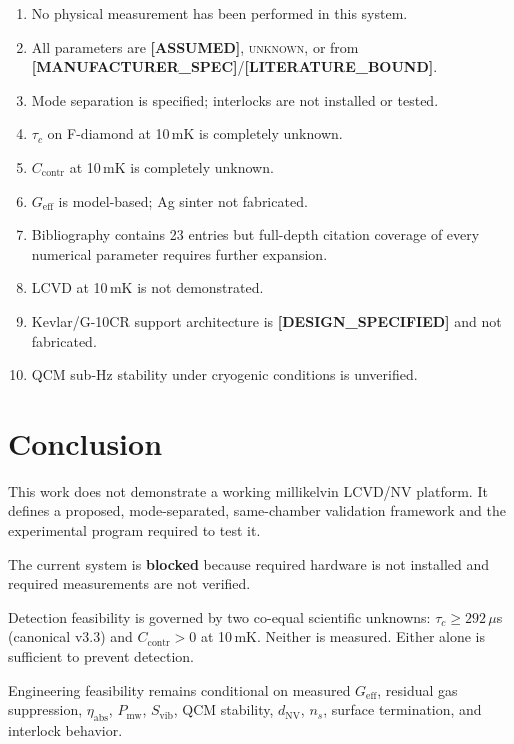 \documentclass[12pt,a4paper]{article}
\newcommand{\unknown}{\textsc{unknown}}
\newcommand{\assumed}{\textbf{[ASSUMED]}}
\newcommand{\designspec}{\textbf{[DESIGN\_SPECIFIED]}}
\newcommand{\mfrspec}{\textbf{[MANUFACTURER\_SPEC]}}
\newcommand{\litbound}{\textbf{[LITERATURE\_BOUND]}}
\begin{document}
\begin{enumerate}[noitemsep]
  \item No physical measurement has been performed in this system.
  \item All parameters are \assumed{}, \unknown{}, or from \mfrspec{}/\litbound{}.
  \item Mode separation is specified; interlocks are not installed or tested.
  \item $\tau_c$ on F-diamond at 10\,mK is completely unknown.
  \item $C_\mathrm{contr}$ at 10\,mK is completely unknown.
  \item $G_\mathrm{eff}$ is model-based; Ag sinter not fabricated.
  \item Bibliography contains 23 entries but full-depth citation coverage
        of every numerical parameter requires further expansion.
  \item LCVD at 10\,mK is not demonstrated.
  \item Kevlar/G-10CR support architecture is \designspec{} and not fabricated.
  \item QCM sub-Hz stability under cryogenic conditions is unverified.
\end{enumerate}

\section{Conclusion}
\label{sec:conclusion}

This work does not demonstrate a working millikelvin LCVD/NV platform.
It defines a proposed, mode-separated, same-chamber validation framework
and the experimental program required to test it.

The current system is \textbf{blocked} because required hardware is not
installed and required measurements are not verified.

Detection feasibility is governed by two co-equal scientific unknowns:
$\tau_c \geq 292\,\mu$s (canonical v3.3) and $C_\mathrm{contr} > 0$ at 10\,mK.
Neither is measured.
Either alone is sufficient to prevent detection.

Engineering feasibility remains conditional on measured $G_\mathrm{eff}$,
residual gas suppression, $\eta_\mathrm{abs}$, $P_\mathrm{mw}$, $S_\mathrm{vib}$,
QCM stability, $d_\mathrm{NV}$, $n_s$, surface termination, and interlock behavior.
\end{document}
